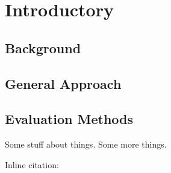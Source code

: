 \chapter{Introductory}
\label{chapterlabel1}
\section{Background}
\section{General Approach}
\section{Evaluation Methods}
Some stuff about things.\cite{example-citation} Some more things. 

Inline citation: 

\blindtext
